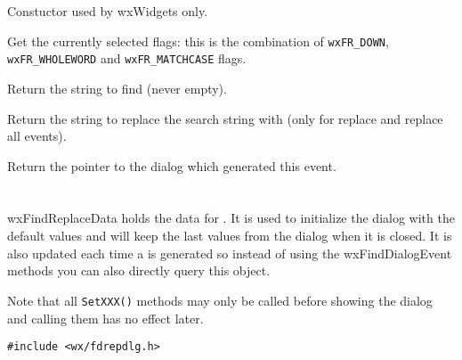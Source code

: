 Constuctor used by wxWidgets only.

\label{wxfinddialogeventgetflags}


Get the currently selected flags: this is the combination of {\tt wxFR\_DOWN},
{\tt wxFR\_WHOLEWORD} and {\tt wxFR\_MATCHCASE} flags.

\label{wxfinddialogeventgetfindstring}


Return the string to find (never empty).

\label{wxfinddialogeventgetreplacestring}


Return the string to replace the search string with (only for replace and
replace all events).

\label{wxfinddialogeventgetdialog}


Return the pointer to the dialog which generated this event.

\section{}\label{wxfindreplacedata}

wxFindReplaceData holds the data for 
. It is used to initialize
the dialog with the default values and will keep the last values from the
dialog when it is closed. It is also updated each time a 
 is generated so instead of
using the wxFindDialogEvent methods you can also directly query this object.

Note that all {\tt SetXXX()} methods may only be called before showing the
dialog and calling them has no effect later.


\begin{verbatim}
#include <wx/fdrepdlg.h>
\end{verbatim}



